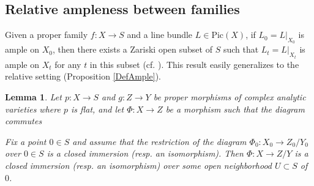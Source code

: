 \documentclass[12pt]{amsart}
\numberwithin{equation}{section}
\newtheorem{lemma}  [theorem]     {Lemma}
\theoremstyle{definition}
\theoremstyle{plain}
\newtheorem*{thm A*}{Theorem A}
\newtheorem*{thm B*}{Theorem B}
\newtheorem*{thm C*}{Theorem C}
\newtheorem*{thm D*}{Theorem D}
\theoremstyle{definition}
\renewcommand{\1}{\mathds{1}}
\renewcommand{\>}{\rightarrow}
\begin{document}
\subsection{Relative ampleness between families}
Given a proper family $f : X \to S$ and a line bundle $ L \in \mathrm{Pic}(X) $, 
if $ L_0 = L|_{X_0} $ is ample on $ X_0 $, then there exists a Zariski open subset of $ S $ 
such that $ L_t = L|_{X_t} $ is ample on $ X_t $ for any $t$ in this subset (cf. \cite[Theorem 1.2.17]{Laza04}). 
This result easily generalizes to the relative setting (Proposition \ref{DefAmple}).
 
\begin{lemma}\label{ResEmbed}
Let $p:X \to S$ and $g:Z \to  Y$ be proper morphisms of complex analytic varieties where $p$ is flat, and let $\Phi: X\to Z$ be a morphism such that the diagram commutes 
\begin{center}
\end{center}
Fix a point $0\in S$ and assume that the restriction of the diagram $\Phi_0: X_0 \rightarrow Z_0/Y_0$ over $0\in S$ is a closed immersion (resp. an isomorphism). Then $\Phi:X\to Z /Y$ is a closed immersion (resp. an isomorphism) over some open neighborhood $U\subset S$ of $0$. 
\end{lemma}
\end{document}
